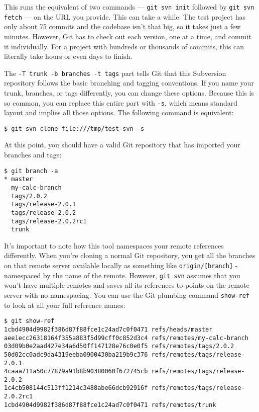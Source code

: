 \documentclass[a4paper]{book}
\begin{document}
This runs the equivalent of two commands --- \texttt{git svn init} followed by \texttt{git svn fetch} --- on the URL you provide. This can take a while. The test project has only about 75 commits and the codebase isn't that big, so it takes just a few minutes. However, Git has to check out each version, one at a time, and commit it individually. For a project with hundreds or thousands of commits, this can literally take hours or even days to finish.

The \texttt{-T trunk -b branches -t tags} part tells Git that this Subversion repository follows the basic branching and tagging conventions. If you name your trunk, branches, or tags differently, you can change these options. Because this is so common, you can replace this entire part with \texttt{-s}, which means standard layout and implies all those options. The following command is equivalent:

\begin{shaded}\begin{verbatim}
$ git svn clone file:///tmp/test-svn -s
\end{verbatim}\end{shaded}

At this point, you should have a valid Git repository that has imported your branches and tags:

\begin{shaded}\begin{verbatim}
$ git branch -a
* master
  my-calc-branch
  tags/2.0.2
  tags/release-2.0.1
  tags/release-2.0.2
  tags/release-2.0.2rc1
  trunk
\end{verbatim}\end{shaded}

It's important to note how this tool namespaces your remote references differently. When you're cloning a normal Git repository, you get all the branches on that remote server available locally as something like \texttt{origin/{[}branch{]}} - namespaced by the name of the remote. However, \texttt{git svn} assumes that you won't have multiple remotes and saves all its references to points on the remote server with no namespacing. You can use the Git plumbing command \texttt{show-ref} to look at all your full reference names:

\begin{shaded}\begin{verbatim}
$ git show-ref
1cbd4904d9982f386d87f88fce1c24ad7c0f0471 refs/heads/master
aee1ecc26318164f355a883f5d99cff0c852d3c4 refs/remotes/my-calc-branch
03d09b0e2aad427e34a6d50ff147128e76c0e0f5 refs/remotes/tags/2.0.2
50d02cc0adc9da4319eeba0900430ba219b9c376 refs/remotes/tags/release-2.0.1
4caaa711a50c77879a91b8b90380060f672745cb refs/remotes/tags/release-2.0.2
1c4cb508144c513ff1214c3488abe66dcb92916f refs/remotes/tags/release-2.0.2rc1
1cbd4904d9982f386d87f88fce1c24ad7c0f0471 refs/remotes/trunk
\end{verbatim}\end{shaded}
\end{document}
